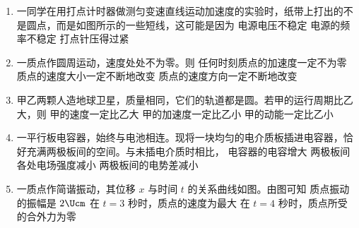 \documentclass[\gkver]{gaokaozhenti}
\begin{document}
\begin{enumerate}
\item
一同学在用打点计时器做测匀变速直线运动加速度的实验时，纸带上打出的不是圆点，而是如图所示的一些短线，这可能是因为
{电源电压不稳定}
{电源的频率不稳定}
{打点针压得过紧}

\item
一质点作圆周运动，速度处处不为零。则
{任何时刻质点的加速度一定不为零}
{质点的速度大小一定不断地改变}
{质点的速度方向一定不断地改变}

\item
甲乙两颗人造地球卫星，质量相同，它们的轨道都是圆。若甲的运行周期比乙大，则
{甲的速度一定比乙大}
{甲的加速度一定比乙小}
{甲的动能一定比乙小}

\item
一平行板电容器，始终与电池相连。现将一块均匀的电介质板插进电容器，恰好充满两极板间的空间。与未插电介质时相比，
{电容器的电容增大}
{两极板间各处电场强度减小}
{两极板间的电势差减小}

\item
一质点作简谐振动，其位移 $x$ 与时间 $t$ 的关系曲线如图。由图可知
{质点振动的振幅是 $2\Ucm$}
{在 $t = 3$ 秒时，质点的速度为最大}
{在 $t = 4$ 秒时，质点所受的合外力为零}


\end{enumerate}
\end{document}
